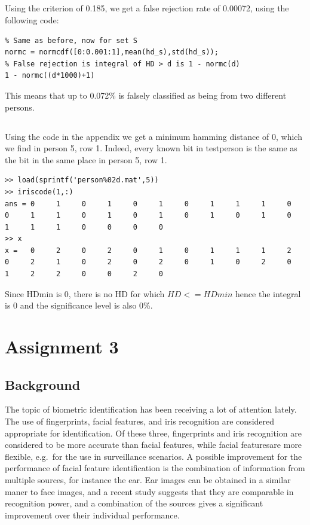 \documentclass{article}
\begin{document}
\subsection{}
Using the criterion of 0.185, we get a false rejection rate of 0.00072, using the following code:
\begin{lstlisting}
% Same as before, now for set S
normc = normcdf([0:0.001:1],mean(hd_s),std(hd_s));
% False rejection is integral of HD > d is 1 - normc(d)
1 - normc((d*1000)+1)
\end{lstlisting}
This means that up to 0.072\% is falsely classified as being from two different persons.

\subsection{}
Using the code in the appendix we get a minimum hamming distance of $0$, which we find in person 5, row 1. Indeed, every known bit in testperson is the same as the bit in the same place in person 5, row 1.
\begin{lstlisting}
>> load(sprintf('person%02d.mat',5))
>> iriscode(1,:)
ans = 0     1     0     1     0     1     0     1     1     1     0     0     1     1     0     1     0     1     0     1     0     1     0     1     1     1     0     0     0     0
>> x
x =   0     2     0     2     0     1     0     1     1     1     2     0     2     1     0     2     0     2     0     1     0     2     0     1     2     2     0     0     2     0
\end{lstlisting}
Since HDmin is $0$, there is no HD for which $HD <= HDmin$ hence the integral is $0$ and  the significance level is also 0\%.

\section{Assignment 3}
\subsection{Background}
The topic of biometric identification has been receiving a lot of attention lately. %
The use of fingerprints, facial features, and iris recognition are considered appropriate for identification.
Of these three, fingerprints and iris recognition are considered to be more accurate than facial features,
while facial featuresare more flexible, e.g.\ for the use in surveillance scenarios.
A possible improvement for the performance of facial feature identification is the combination of information from multiple sources,
for instance the ear.
Ear images can be obtained in a similar maner to face images, 
and a recent study suggests that they are comparable in recognition power\cite{chang2003comparison},
and a combination of the sources gives a significant improvement over their individual performance.
\end{document}
